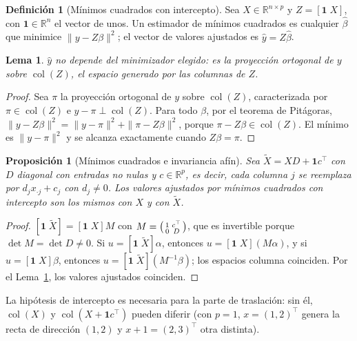 \documentclass[11pt,a4paper]{article}
\theoremstyle{plain}
\newtheorem{proposicion}[teorema]{Proposición}
\newtheorem{lema}[teorema]{Lema}
\theoremstyle{definition}
\newtheorem{definicion}[teorema]{Definición}
\theoremstyle{remark}
\newcommand{\R}{\mathbb{R}}
\newcommand{\col}{\operatorname{col}}
\newcommand{\1}{\mathbf{1}}
\begin{document}
\begin{definicion}[Mínimos cuadrados con intercepto]
Sea $X\in\R^{n\times p}$ y $Z=[\1\;X]$, con $\1\in\R^n$ el vector de unos.
Un estimador de mínimos cuadrados es cualquier $\hat\beta$ que minimice
$\|y-Z\beta\|^2$; el vector de valores ajustados es $\hat y=Z\hat\beta$.
\end{definicion}

\begin{lema}\label{lem:proy}
$\hat y$ no depende del minimizador elegido: es la proyección ortogonal de
$y$ sobre $\col(Z)$, el espacio generado por las columnas de $Z$.
\end{lema}

\begin{proof}
Sea $\pi$ la proyección ortogonal de $y$ sobre $\col(Z)$, caracterizada
por $\pi\in\col(Z)$ e $y-\pi\perp\col(Z)$. Para todo $\beta$, por el
teorema de Pitágoras, $\|y-Z\beta\|^2=\|y-\pi\|^2+\|\pi-Z\beta\|^2$,
porque $\pi-Z\beta\in\col(Z)$. El mínimo es $\|y-\pi\|^2$ y se alcanza
exactamente cuando $Z\beta=\pi$.
\end{proof}

\begin{proposicion}[Mínimos cuadrados e invariancia afín]\label{prop:ols}
Sea $\tilde X=XD+\1c^\top$ con $D$ diagonal con entradas no nulas y
$c\in\R^p$, es decir, cada columna $j$ se reemplaza por
$d_jx_{\cdot j}+c_j$ con $d_j\ne0$. Los valores ajustados por mínimos
cuadrados con intercepto son los mismos con $X$ y con $\tilde X$.
\end{proposicion}

\begin{proof}
$[\1\;\tilde X]=[\1\;X]M$ con
$M=\begin{psmallmatrix}1&c^\top\\0&D\end{psmallmatrix}$, que es invertible
porque $\det M=\det D\ne0$. Si $u=[\1\;\tilde X]\alpha$, entonces
$u=[\1\;X](M\alpha)$, y si $u=[\1\;X]\beta$, entonces
$u=[\1\;\tilde X](M^{-1}\beta)$; los espacios columna coinciden. Por el
Lema~\ref{lem:proy}, los valores ajustados coinciden.
\end{proof}

La hipótesis de intercepto es necesaria para la parte de traslación: sin
él, $\col(X)$ y $\col(X+\1c^\top)$ pueden diferir (con $p=1$,
$x=(1,2)^\top$ genera la recta de dirección $(1,2)$ y $x+1=(2,3)^\top$ otra
distinta).
\end{document}
